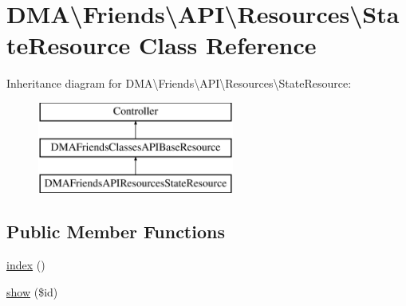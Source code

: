 \hypertarget{classDMA_1_1Friends_1_1API_1_1Resources_1_1StateResource}{}\section{D\+M\+A\textbackslash{}Friends\textbackslash{}A\+P\+I\textbackslash{}Resources\textbackslash{}State\+Resource Class Reference}
\label{classDMA_1_1Friends_1_1API_1_1Resources_1_1StateResource}
Inheritance diagram for D\+M\+A\textbackslash{}Friends\textbackslash{}A\+P\+I\textbackslash{}Resources\textbackslash{}State\+Resource\+:\begin{figure}[H]
\begin{center}
\leavevmode
\includegraphics[height=3.000000cm]{d7/db1/classDMA_1_1Friends_1_1API_1_1Resources_1_1StateResource}
\end{center}
\end{figure}
\subsection*{Public Member Functions}
\begin{DoxyCompactItemize}
\item 
\hyperlink{classDMA_1_1Friends_1_1API_1_1Resources_1_1StateResource_a8acd31884c7184e218a8d0801dc02b7d}{index} ()
\item 
\hyperlink{classDMA_1_1Friends_1_1API_1_1Resources_1_1StateResource_a84f2ee0e89681bdc1c5bee4ce26e3e85}{show} (\$id)
\end{DoxyCompactItemize}
